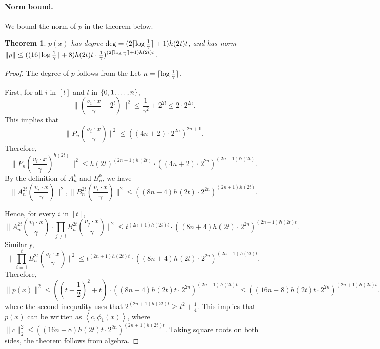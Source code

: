 \documentclass{article}
\DeclarePairedDelimiter\ceil{\lceil}{\rceil}
\newcommand{\inner}[1]{ \left\langle {#1} \right\rangle }
\newtheorem{theorem}{Theorem}
\begin{document}
\paragraph{Norm bound.} We bound the norm of $p$ in the theorem below.
\begin{theorem}
$p(x)$ has degree $\deg = (2\ceil{\log \frac 1 \gamma}+1)h(2t)t$, and has norm $\|p\| \leq ((16\ceil{\log \frac 1 \gamma}+8) h(2t) t \cdot \frac 1 \gamma)^{(2\ceil{\log \frac 1 \gamma}+1)h(2t)t}$.
\end{theorem}
\begin{proof}
The degree of $p$ follows from the
Let $n = \ceil{\log \frac 1 \gamma}$.

First, for all $i$ in $[t]$ and $l$ in $\cbr{0,1,\ldots,n}$,
\[ \| (\frac{v_i \cdot x}{\gamma} - 2^l) \|^2 \leq \frac{1}{\gamma^2} + 2^{2l} \leq 2 \cdot 2^{2n}. \]
This implies that
\[ \| P_n(\frac{v_i \cdot x}{\gamma}) \|^2 \leq ((4n+2) \cdot 2^{2n})^{2n+1}. \]
Therefore,
\[ \| P_n(\frac{v_i \cdot x}{\gamma})^{h(2t)} \|^2 \leq h(2t)^{(2n+1)h(2t)} \cdot ((4n+2) \cdot 2^{2n})^{(2n+1)h(2t)}. \]
By the definition of $A_n^k$ and $B_n^k$, we have
\[ \| A_n^{2t}(\frac{v_i \cdot x}{\gamma}) \|^2,  \| B_n^{2t}(\frac{v_i \cdot x}{\gamma}) \|^2 \leq ((8n+4) h(2t) \cdot 2^{2n})^{(2n+1)h(2t)}. \]

Hence, for every $i$ in $[t]$,
\[
\| A_n^{2t}(\frac{v_i \cdot x}{\gamma}) \cdot \prod_{j \neq i} B_n^{2t}(\frac{v_j \cdot x}{\gamma}) \|^2
\leq
t^{(2n+1) h(2t) t} \cdot ((8n+4) h(2t) \cdot 2^{2n})^{(2n+1)h(2t)t}.
\]
Similarly,
\[
\| \prod_{i=1}^t B_n^{2t}(\frac{v_i \cdot x}{\gamma}) \|^2 \leq t^{(2n+1) h(2t) t} \cdot ((8n+4) h(2t) \cdot 2^{2n})^{(2n+1)h(2t)t}.
\]
Therefore,
\[
\| p(x) \|^2 \leq ((t - \frac 1 2)^2 + t) \cdot ((8n+4) h(2t) t \cdot 2^{2n})^{(2n+1)h(2t)t} \leq ((16n+8) h(2t) t \cdot 2^{2n})^{(2n+1)h(2t)t}.
\]
where the second inequality uses that $2^{(2n+1)h(2t)t} \geq t^2 + \frac 1 4$.
This implies that $p(x)$ can be written as $\inner{c, \phi_1(x)}$, where $\| c \|_2^2 \leq ((16n+8) h(2t) t \cdot 2^{2n})^{(2n+1)h(2t)t}$. Taking square roots on both sides, the theorem follows from algebra.
\end{proof}
\end{document}
